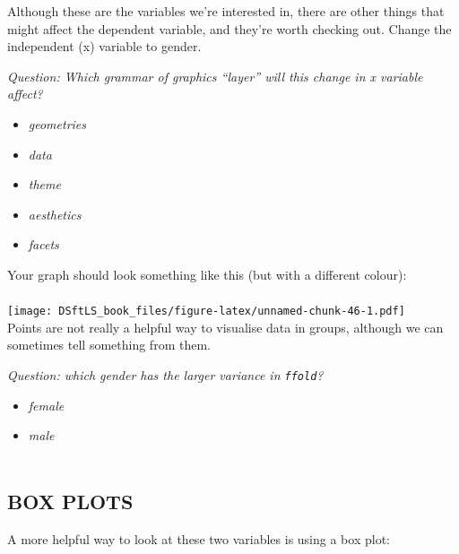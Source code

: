 \documentclass[
]{book}
\providecommand{\tightlist}{%
  \setlength{\itemsep}{0pt}\setlength{\parskip}{0pt}}
\begin{document}
Although these are the variables we're interested in, there are other things that
might affect the dependent variable, and they're worth checking out. Change the
independent (x) variable to gender.

\emph{Question: Which grammar of graphics ``layer'' will this change in x variable affect?}

\begin{itemize}
\tightlist
\item
  \emph{geometries}
\item
  \emph{data}
\item
  \emph{theme}
\item
  \emph{aesthetics}
\item
  \emph{facets}\\
\end{itemize}

Your graph should look something like this (but with a different colour):\\
~\\
\texttt{[image: DSftLS\_book\_files/figure-latex/unnamed-chunk-46-1.pdf]}\\

Points are not really a helpful way to visualise data in groups, although
we can sometimes tell something from them.

\emph{Question: which gender has the larger variance in \texttt{ffold}?}

\begin{itemize}
\tightlist
\item
  \emph{female}
\item
  \emph{male}\\
  ~\\
\end{itemize}

\hypertarget{box-plots}{%
\subsection{BOX PLOTS}\label{box-plots}}

A more helpful way to look at these two variables is using a box plot:
\end{document}
